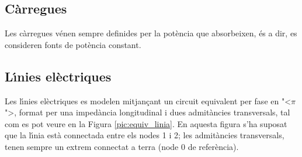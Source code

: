 \subsection{C\`{a}rregues}

Les c\`{a}rregues v\'{e}nen sempre definides per la pot\`{e}ncia que absorbeixen, \'{e}s a dir, es consideren fonts de pot\`{e}ncia constant.

\subsection{L\'{\i}nies el\`{e}ctriques} 

Les l\'{\i}nies el\`{e}ctriques es modelen mitjan\c{c}ant un circuit equivalent
per fase en {"<}$\pi${">}, format per una imped\`{a}ncia longitudinal i dues
admit\`{a}ncies transversals, tal com es pot veure en la Figura
\vref{pic:equiv_linia}. En aquesta figura s'ha suposat que la l\'{\i}nia
est\`{a} connectada entre els nodes 1 i 2; les admit\`{a}ncies transversals,
tenen sempre un extrem connectat a terra (node 0 de refer\`{e}ncia).

